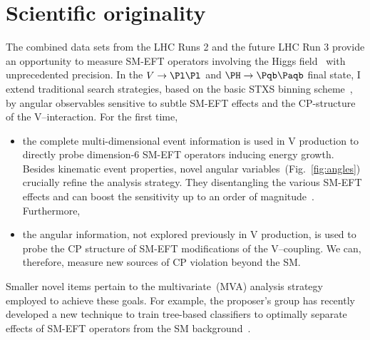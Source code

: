\documentclass[a4paper,11pt]{article}
\newcommand{\Pb}{{{\Pqb}}\xspace}
\newcommand{\PAb}{{{{\Paqb}}}\xspace}
\renewcommand{\PV}{{{{V}}}\xspace}
\newcommand{\VH}{{{\PV}{\PH}}\xspace}
\begin{document}
\section{Scientific originality}

The combined data sets from the LHC Runs 2 and the future LHC Run 3 provide an opportunity to measure SM-EFT operators involving the Higgs field~\cite{Elias-Miro:2013mua,Gupta:2014rxa} with unprecedented precision. 
In the $\PV\to\Pl\Pl$ and $\PH \to \Pb\PAb$ final state, I extend traditional search strategies, based on the basic STXS binning scheme~\cite{Berger:2019wnu}, by angular observables sensitive to subtle SM-EFT effects and the CP-structure of the \PV--\PH interaction. For the first time,



\begin{itemize}

\item the complete multi-dimensional event information is used in \VH production to directly probe dimension-6 SM-EFT operators inducing energy growth.
Besides kinematic event properties, novel angular variables~(Fig.~\ref{fig:angles}) crucially refine the analysis strategy. 
They disentangling the various SM-EFT effects and can boost the sensitivity up to an order of magnitude~\cite{CMS-PAS-SMP-20-005}. Furthermore, 

\item the angular information, not explored previously in \VH production, is used to probe the CP structure of SM-EFT modifications of the \PV--\PH coupling. We can, therefore, measure new sources of CP violation beyond the SM.
\end{itemize}

Smaller novel items pertain to the multivariate~(MVA) analysis strategy employed to achieve these goals. 
For example, the proposer's group has recently developed a new technique to train tree-based classifiers to optimally separate effects of SM-EFT operators from the SM background~\cite{Chatterjee:2021nms}.
\end{document}
